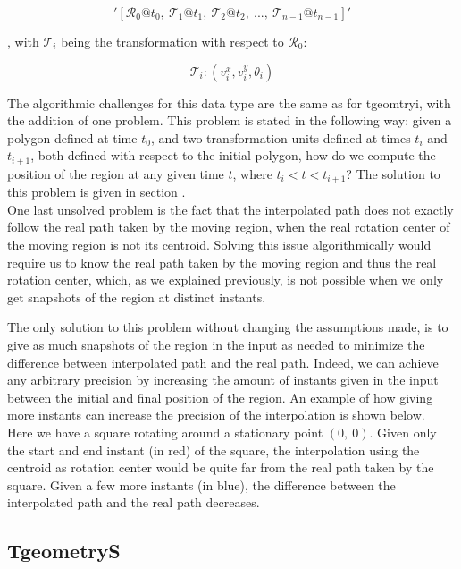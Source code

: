 \[
    '[\mathcal{R}_0@t_0,\ \mathcal{T}_1@t_1,\ \mathcal{T}_2@t_2,\ ..., \ \mathcal{T}_{n-1}@t_{n-1}]'
\]

, with $\mathcal{T}_i$ being the transformation with respect to $\mathcal{R}_0$:

\[
    \mathcal{T}_i: (v_i^x, v_i^y, \theta_i)
\]

The algorithmic challenges for this data type are the same as for tgeomtryi, with the addition of one problem. This problem is stated in the following way: given a polygon defined at time $t_0$, and two transformation units defined at times $t_i$ and $t_{i+1}$, both defined with respect to the initial polygon, how do we compute the position of the region at any given time $t$, where $t_i < t < t_{i+1}$? The solution to this problem is given in section . \\

One last unsolved problem is the fact that the interpolated path does not exactly follow the real path taken by the moving region, when the real rotation center of the moving region is not its centroid. Solving this issue algorithmically would require us to know the real path taken by the moving region and thus the real rotation center, which, as we explained previously, is not possible when we only get snapshots of the region at distinct instants. 

The only solution to this problem without changing the assumptions made, is to give as much snapshots of the region in the input as needed to minimize the difference between interpolated path and the real path. Indeed, we can achieve any arbitrary precision by increasing the amount of instants given in the input between the initial and final position of the region. An example of how giving more instants can increase the precision of the interpolation is shown below. \\

Here we have a square rotating around a stationary point $(0,\ 0)$. Given only the start and end instant (in red) of the square, the interpolation using the centroid as rotation center would be quite far from the real path taken by the square. Given a few more instants (in blue), the difference between the interpolated path and the real path decreases.


\subsection{TgeometryS}

